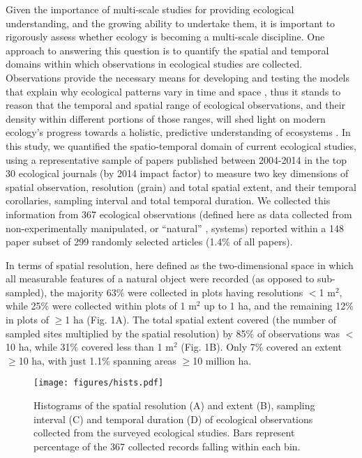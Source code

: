 \documentclass[12pt]{article}
\begin{document}
Given the importance of multi-scale studies for providing ecological understanding, and the growing ability to undertake them, it is important to rigorously assess whether ecology is becoming a multi-scale discipline. One approach to answering this question is to quantify the spatial and temporal domains within which observations in ecological studies are collected. Observations provide the necessary means for developing and testing the models that explain why ecological patterns vary in time and space \cite{levin_problem_1992,tilman_ecological_1989}, thus it stands to reason that the temporal and spatial range of ecological observations, and their density within different portions of those ranges, will shed light on modern ecology's progress towards a holistic, predictive understanding of ecosystems \cite{chave_problem_2013,levin_problem_1992}. In this study, we quantified the spatio-temporal domain of current ecological studies, using a representative sample of papers published between 2004-2014 in the top 30 ecological journals (by 2014 impact factor) to measure two key dimensions of spatial observation, resolution (grain) and total spatial extent, and their temporal corollaries, sampling interval and total temporal duration. We collected this information from 367 ecological observations (defined here as data collected from non-experimentally manipulated, or ``natural'' \cite{tilman_ecological_1989}, systems) reported within a 148 paper subset of 299 randomly selected articles (1.4\% of all papers). 

In terms of spatial resolution, here defined as the two-dimensional space in which all measurable features of a natural object were recorded (as opposed to sub-sampled), the majority 63\% were collected in plots having resolutions $<$1 m$^2$, while 25\% were collected within plots of 1 m$^2$ up to 1 ha, and the remaining 12\% in plots of $\geq$1 ha (Fig. 1A). The total spatial extent covered (the number of sampled sites multiplied by the spatial resolution) by 85\% of observations was $<$10 ha, while 31\% covered less than 1 m$^2$ (Fig. 1B).  Only 7\% covered an extent $\geq$10 ha, with just 1.1\% spanning areas $\geq$10 million ha. 

\begin{figure}[!ht]
\texttt{[image: figures/hists.pdf]}
\vspace{-0.15 cm}
\caption{Histograms of the spatial resolution (A) and extent (B), sampling interval (C) and temporal duration (D) of ecological observations collected from the surveyed ecological studies. Bars represent percentage of the 367 collected records falling within each bin.}
\label{afoto1}
\end{figure}
\end{document}
